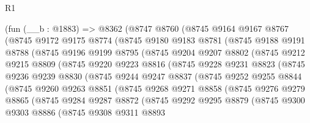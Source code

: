 \begin{lexlean}{R1}
\begin{coremodule}
    (fun (__b : @1883) =>
    @8362
      (@8747
        @8760
        (@8745
          @9164
          @9167
          @8767
          (@8745
            @9172
            @9175
            @8774
            (@8745
              @9180
              @9183
              @8781
              (@8745
                @9188
                @9191
                @8788
                (@8745
                  @9196
                  @9199
                  @8795
                  (@8745
                    @9204
                    @9207
                    @8802
                    (@8745
                      @9212
                      @9215
                      @8809
                      (@8745
                        @9220
                        @9223
                        @8816
                        (@8745
                          @9228
                          @9231
                          @8823
                          (@8745
                            @9236
                            @9239
                            @8830
                            (@8745
                              @9244
                              @9247
                              @8837
                              (@8745
                                @9252
                                @9255
                                @8844
                                (@8745
                                  @9260
                                  @9263
                                  @8851
                                  (@8745
                                    @9268
                                    @9271
                                    @8858
                                    (@8745
                                      @9276
                                      @9279
                                      @8865
                                      (@8745
                                        @9284
                                        @9287
                                        @8872
                                        (@8745
                                          @9292
                                          @9295
                                          @8879
                                          (@8745
                                            @9300
                                            @9303
                                            @8886
                                            (@8745
                                              @9308
                                              @9311
                                              @8893

\end{coremodule}
\end{lexlean}
